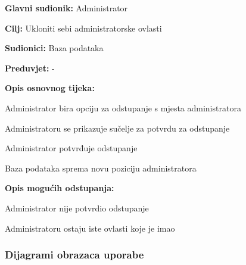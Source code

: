 \noindent {}
\begin{packed_item}

\item \textbf{Glavni sudionik:} Administrator
\item  \textbf{Cilj:} Ukloniti sebi administratorske ovlasti
\item  \textbf{Sudionici:} Baza podataka
\item  \textbf{Preduvjet:} -
\item  \textbf{Opis osnovnog tijeka:}

\item[] \begin{packed_enum}

    \item Administrator bira opciju za odstupanje s mjesta administratora
    \item Administratoru se prikazuje sučelje za potvrdu za odstupanje
    \item Administrator potvrđuje odstupanje
    \item Baza podataka sprema novu poziciju administratora

\end{packed_enum}

\item  \textbf{Opis mogućih odstupanja:}

\item[] \begin{packed_item}

    \item[3.a] Administrator nije potvrdio odstupanje
    \item[] \begin{packed_enum}

        \item Administratoru ostaju iste ovlasti koje je imao

    \end{packed_enum}

\end{packed_item}
\end{packed_item}

\subsubsection{Dijagrami obrazaca uporabe}

